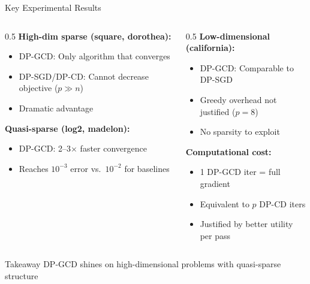 \documentclass{beamer}
\begin{document}
\begin{frame}{Key Experimental Results}
\begin{columns}[T]
\begin{column}{0.5\textwidth}
\textbf{High-dim sparse (square, dorothea):}
\begin{itemize}
\item DP-GCD: \alert{Only algorithm that converges}
\item DP-SGD/DP-CD: Cannot decrease objective ($p \gg n$)
\item Dramatic advantage
\end{itemize}

\vspace{1em}

\textbf{Quasi-sparse (log2, madelon):}
\begin{itemize}
\item DP-GCD: 2--3$\times$ faster convergence
\item Reaches $10^{-3}$ error vs.\ $10^{-2}$ for baselines
\end{itemize}
\end{column}

\begin{column}{0.5\textwidth}
\textbf{Low-dimensional (california):}
\begin{itemize}
\item DP-GCD: Comparable to DP-SGD
\item Greedy overhead not justified ($p = 8$)
\item No sparsity to exploit
\end{itemize}

\vspace{1em}

\textbf{Computational cost:}
\begin{itemize}
\item 1 DP-GCD iter = full gradient
\item Equivalent to $p$ DP-CD iters
\item Justified by better utility per pass
\end{itemize}
\end{column}
\end{columns}

\vspace{1em}

\begin{alertblock}{Takeaway}
DP-GCD shines on high-dimensional problems with quasi-sparse structure
\end{alertblock}
\end{frame}
\end{document}
